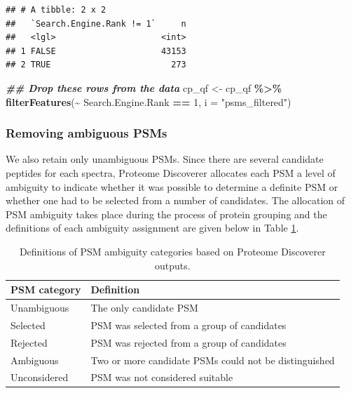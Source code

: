 \documentclass[9pt,a4paper,]{extarticle}
\newenvironment{Shaded}{\begin{snugshade}}{\end{snugshade}}
\newcommand{\AttributeTok}[1]{\textcolor[rgb]{0.13,0.29,0.53}{#1}}
\newcommand{\DecValTok}[1]{\textcolor[rgb]{0.00,0.00,0.81}{#1}}
\newcommand{\DocumentationTok}[1]{\textcolor[rgb]{0.56,0.35,0.01}{\textbf{\textit{#1}}}}
\newcommand{\FunctionTok}[1]{\textcolor[rgb]{0.13,0.29,0.53}{\textbf{#1}}}
\newcommand{\NormalTok}[1]{#1}
\newcommand{\OtherTok}[1]{\textcolor[rgb]{0.56,0.35,0.01}{#1}}
\newcommand{\SpecialCharTok}[1]{\textcolor[rgb]{0.81,0.36,0.00}{\textbf{#1}}}
\newcommand{\StringTok}[1]{\textcolor[rgb]{0.31,0.60,0.02}{#1}}
\begin{document}
\begin{verbatim}
## # A tibble: 2 x 2
##   `Search.Engine.Rank != 1`     n
##   <lgl>                     <int>
## 1 FALSE                     43153
## 2 TRUE                        273
\end{verbatim}

\begin{Shaded}
\begin{Highlighting}[]
\DocumentationTok{\#\# Drop these rows from the data}
\NormalTok{cp\_qf }\OtherTok{\textless{}{-}}\NormalTok{ cp\_qf }\SpecialCharTok{\%\textgreater{}\%}
  \FunctionTok{filterFeatures}\NormalTok{(}\SpecialCharTok{\textasciitilde{}}\NormalTok{ Search.Engine.Rank }\SpecialCharTok{==} \DecValTok{1}\NormalTok{,}
                 \AttributeTok{i =} \StringTok{"psms\_filtered"}\NormalTok{)}
\end{Highlighting}
\end{Shaded}

\subsubsection{Removing ambiguous PSMs}\label{removing-ambiguous-psms}

We also retain only unambiguous PSMs. Since there are several candidate
peptides for each spectra, Proteome Discoverer allocates each PSM a level of
ambiguity to indicate whether it was possible to determine a definite PSM or
whether one had to be selected from a number of candidates. The allocation of
PSM ambiguity takes place during the process of protein grouping and the
definitions of each ambiguity assignment are given below in Table
\ref{tab:table3}.

\begin{table}

\caption{\label{tab:table3}Definitions of PSM ambiguity categories based on Proteome Discoverer outputs.}
\centering
\begin{tabular}[t]{l|l}
\hline
PSM category & Definition\\
\hline
Unambiguous & The only candidate PSM\\
\hline
Selected & PSM was selected from a group of candidates\\
\hline
Rejected & PSM was rejected from a group of candidates\\
\hline
Ambiguous & Two or more candidate PSMs could not be distinguished\\
\hline
Unconsidered & PSM was not considered suitable\\
\hline
\end{tabular}
\end{table}
\end{document}
